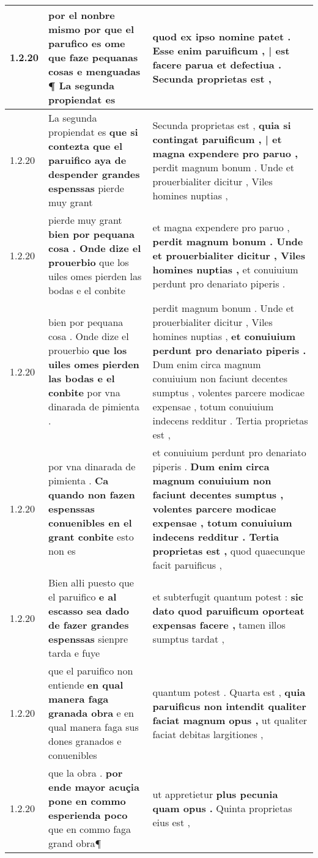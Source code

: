 \begin{tabular}{|p{1cm}|p{6.5cm}|p{6.5cm}|}
1.2.20 & por el nonbre mismo \textbf{ por que el parufico es ome que faze pequanas cosas e menguadas ¶ } La segunda propiendat es & quod ex ipso nomine patet . \textbf{ Esse enim paruificum , | est facere parua et defectiua . } Secunda proprietas est , \\\hline
1.2.20 & La segunda propiendat es \textbf{ que si contezta que el paruifico aya de despender grandes espenssas } pierde muy grant & Secunda proprietas est , \textbf{ quia si contingat paruificum , | et magna expendere pro paruo , } perdit magnum bonum . Unde et prouerbialiter dicitur , Viles homines nuptias , \\\hline
1.2.20 & pierde muy grant \textbf{ bien por pequana cosa . Onde dize el prouerbio } que los uiles omes pierden las bodas e el conbite & et magna expendere pro paruo , \textbf{ perdit magnum bonum . Unde et prouerbialiter dicitur , Viles homines nuptias , } et conuiuium perdunt pro denariato piperis . \\\hline
1.2.20 & bien por pequana cosa . Onde dize el prouerbio \textbf{ que los uiles omes pierden las bodas e el conbite } por vna dinarada de pimienta . & perdit magnum bonum . Unde et prouerbialiter dicitur , Viles homines nuptias , \textbf{ et conuiuium perdunt pro denariato piperis . } Dum enim circa magnum conuiuium non faciunt decentes sumptus , volentes parcere modicae expensae , totum conuiuium indecens redditur . Tertia proprietas est , \\\hline
1.2.20 & por vna dinarada de pimienta . \textbf{ Ca quando non fazen espenssas conuenibles en el grant conbite } esto non es & et conuiuium perdunt pro denariato piperis . \textbf{ Dum enim circa magnum conuiuium non faciunt decentes sumptus , volentes parcere modicae expensae , totum conuiuium indecens redditur . Tertia proprietas est , } quod quaecunque facit paruificus , \\\hline
1.2.20 & Bien alłi puesto que el paruifico \textbf{ e al escasso sea dado de fazer grandes espenssas } sienpre tarda e fuye & et subterfugit quantum potest : \textbf{ sic dato quod paruificum oporteat expensas facere , } tamen illos sumptus tardat , \\\hline
1.2.20 & que el paruifico non entiende \textbf{ en qual manera faga granada obra } e en qual manera faga sus dones granados e conuenibles & quantum potest . Quarta est , \textbf{ quia paruificus non intendit qualiter faciat magnum opus , } ut qualiter faciat debitas largitiones , \\\hline
1.2.20 & que la obra . \textbf{ por ende mayor acuçia pone en commo esperienda poco } que en commo faga grand obra¶ & ut appretietur \textbf{ plus pecunia quam opus . } Quinta proprietas eius est , \\\hline

\end{tabular}
